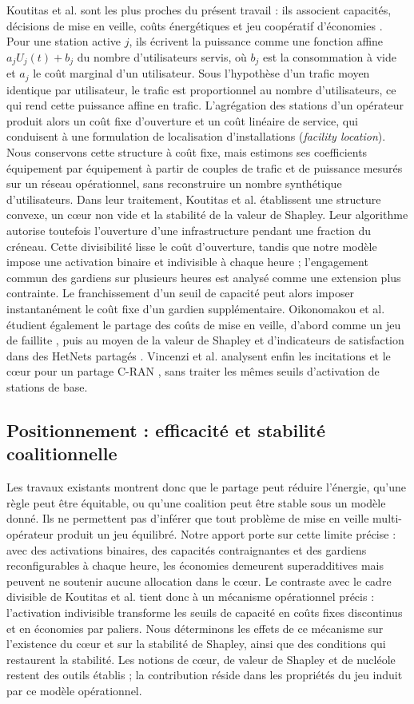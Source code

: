 Koutitas et al. sont les plus proches du présent travail : ils associent
capacités, décisions de mise en veille, coûts énergétiques et jeu coopératif
d'économies \cite{koutitas2016}. Pour une station active \(j\), ils écrivent
la puissance comme une fonction affine \(a_j U_j(t)+b_j\) du nombre
d'utilisateurs servis, où \(b_j\) est la consommation à vide et \(a_j\) le
coût marginal d'un utilisateur. Sous
l'hypothèse d'un trafic moyen identique par utilisateur, le trafic est
proportionnel au nombre d'utilisateurs, ce qui rend cette puissance affine en
trafic. L'agrégation des stations d'un opérateur produit alors un coût fixe
d'ouverture et un coût linéaire de service, qui conduisent à une formulation
de localisation d'installations (\emph{facility location}). Nous conservons cette structure à coût fixe, mais
estimons ses coefficients équipement par équipement à partir de couples de
trafic et de puissance mesurés sur un réseau opérationnel, sans reconstruire
un nombre synthétique d'utilisateurs. Dans leur traitement, Koutitas et al.
établissent une structure convexe, un cœur non vide et la stabilité de la
valeur de Shapley. Leur algorithme autorise toutefois l'ouverture d'une
infrastructure pendant une fraction du créneau. Cette divisibilité lisse le
coût d'ouverture, tandis que notre modèle impose une activation binaire et
indivisible à chaque heure ; l'engagement commun des gardiens sur plusieurs
heures est analysé comme une extension plus contrainte. Le franchissement
d'un seuil de capacité peut alors imposer instantanément le
coût fixe d'un gardien supplémentaire. Oikonomakou et al.
étudient également le partage des coûts de mise en veille, d'abord comme un
jeu de faillite \cite{oikonomakou2015}, puis au moyen de la valeur de Shapley
et d'indicateurs de satisfaction dans des HetNets partagés
\cite{oikonomakou2017}. Vincenzi et al. analysent enfin les incitations et le
cœur pour un partage C-RAN \cite{vincenzi2017}, sans traiter les mêmes seuils
d'activation de stations de base.

\subsection{Positionnement : efficacité et stabilité coalitionnelle}

Les travaux existants montrent donc que le partage peut réduire l'énergie,
qu'une règle peut être équitable, ou qu'une coalition peut être stable sous
un modèle donné. Ils ne permettent pas d'inférer que tout problème de mise en
veille multi-opérateur produit un jeu équilibré. Notre apport porte sur cette
limite précise : avec des activations binaires, des capacités contraignantes
et des gardiens reconfigurables à chaque heure, les économies demeurent
superadditives mais peuvent ne soutenir aucune allocation dans le cœur. Le contraste avec le
cadre divisible de Koutitas et al. tient donc à un mécanisme opérationnel
précis : l'activation indivisible transforme les seuils de capacité en coûts
fixes discontinus et en économies par paliers. Nous déterminons les effets de
ce mécanisme sur l'existence du cœur et sur la stabilité de Shapley, ainsi que
des conditions qui restaurent la stabilité. Les notions de cœur, de valeur de
Shapley et de nucléole restent des outils établis ; la contribution réside
dans les propriétés du jeu induit par ce modèle opérationnel.

